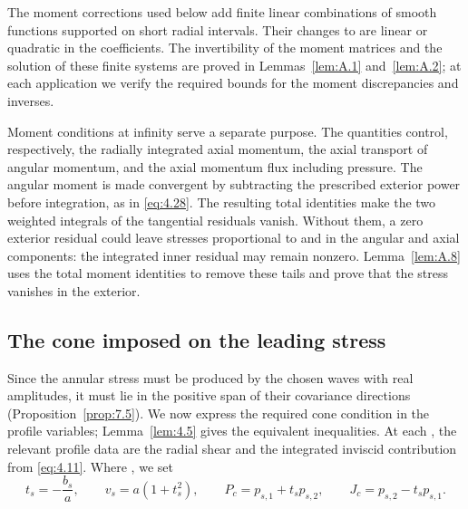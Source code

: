 The moment corrections used below add finite linear combinations of smooth
functions supported on short radial intervals. Their changes to
 are linear or quadratic in the coefficients.
The invertibility of the moment matrices and the solution of these finite
systems are proved in Lemmas~\ref{lem:A.1} and~\ref{lem:A.2}; at each
application we verify the required bounds for the moment discrepancies and
inverses.

Moment conditions at infinity serve a separate purpose. The quantities
 control, respectively, the radially integrated
axial momentum, the axial transport of angular momentum, and the axial
momentum flux including pressure. The angular moment
 is made convergent by subtracting the prescribed
exterior power  before integration, as
in \eqref{eq:4.28}. The resulting total identities make the two weighted
integrals of the tangential residuals vanish. Without them, a zero exterior
residual could leave stresses proportional to 
and  in the angular and axial components: the
integrated inner residual may remain nonzero. Lemma~\ref{lem:A.8} uses the
total moment identities to remove these tails and prove that the stress
vanishes in the exterior.

\subsection{The cone imposed on the leading stress}\label{sec:4.3}

Since the annular stress  must be produced
by the chosen waves with real amplitudes, it must lie in the positive span of
their covariance directions (Proposition~\ref{prop:7.5}). We now express the
required cone condition in the profile variables; Lemma~\ref{lem:4.5} gives
the equivalent inequalities. At each , the
relevant profile data are the radial shear
 and the integrated inviscid contribution
 from \eqref{eq:4.11}. Where
, we set
\begin{equation}
 t_s=-\frac{b_s}{a},\qquad
 v_s=a(1+t_s^2),\qquad
 P_c=p_{s,1}+t_sp_{s,2},\qquad
 J_c=p_{s,2}-t_sp_{s,1}.
\tag{4.20}\label{eq:4.20}
\end{equation}
